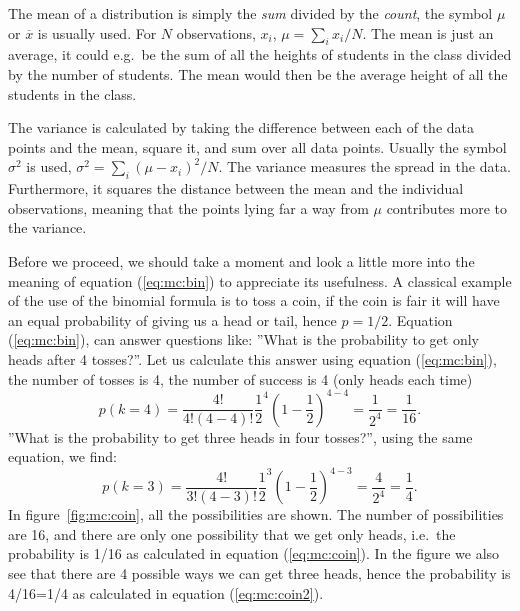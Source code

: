 \documentclass[graybox,sectrefs,envcountresetchap,open=right,final]{svmonodo}
\newenvironment{graybox2admon}[1][]{
\begin{graybox2mdframed}[frametitle=#1]
}
{
\end{graybox2mdframed}
}
\begin{document}
\begin{graybox2admon}[Mean and variance]
The mean of a distribution is simply the \emph{sum} divided by the \emph{count},
the symbol $\mu$ or $\overline{x}$ is usually used. For $N$ observations, $x_i$,
$\mu=\sum_i x_i/N$. The mean is just an average, it could e.g.~be the sum of all the heights of
students in the class divided by the number of students. The mean
would then be the average height of all the students in the class.

The variance is calculated by taking the difference between each of
the data points and the mean, square it, and sum over all data points.
Usually the symbol $\sigma^2$ is used, $\sigma^2=\sum_i(\mu-x_i)^2/N$.
The variance measures the spread in the data. Furthermore, it squares the
distance between the mean and the individual observations, meaning
that the points lying far a way from $\mu$ contributes more to the
variance.
\end{graybox2admon}



Before we proceed, we should take a moment and look a little more into
the meaning of equation (\ref{eq:mc:bin}) to appreciate its usefulness.  A classical example of the use of the binomial formula is to toss a coin, if the coin is fair it will have an equal probability of giving us a head or tail, hence $p=1/2$. Equation (\ref{eq:mc:bin}), can answer questions like: ''What is the probability to get only heads after 4 tosses?''. Let us calculate this answer using equation (\ref{eq:mc:bin}), the number of tosses is 4, the number of success is 4 (only heads each time)
\begin{equation}
p(k=4)=\frac{4!}{4!(4-4)!}\frac{1}{2}^4(1-\frac{1}{2})^{4-4}=\frac{1}{2^4}=\frac{1}{16}.
\label{eq:mc:coin}
\end{equation}
''What is the probability to get three heads in four tosses?'', using
the same equation, we find:
\begin{equation}
p(k=3)=\frac{4!}{3!(4-3)!}\frac{1}{2}^3(1-\frac{1}{2})^{4-3}=\frac{4}{2^4}=\frac{1}{4}.
\label{eq:mc:coin2}
\end{equation}
In figure~\ref{fig:mc:coin}, all the possibilities are shown. The
number of possibilities are 16, and there are only one possibility
that we get only heads, i.e.~the probability is 1/16 as calculated in
equation (\ref{eq:mc:coin}). In the figure we also see that there are 4
possible ways we can get three heads, hence the probability is
4/16=1/4 as calculated in equation (\ref{eq:mc:coin2}).
\end{document}
